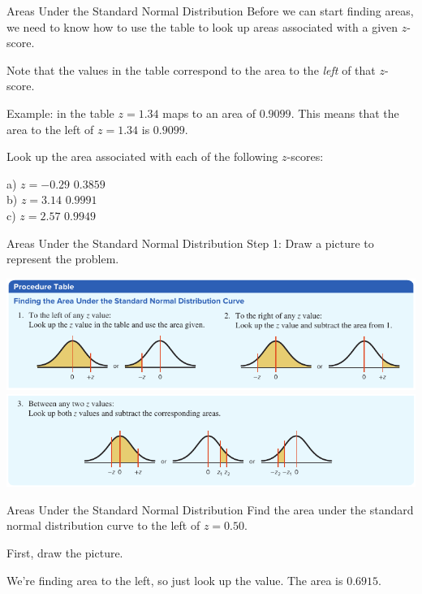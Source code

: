 \documentclass[t, aspectratio=169]{beamer}
\newcommand{\?}{\stackrel{?}{=}}
\begin{document}
	\begin{frame}{Areas Under the Standard Normal Distribution}
		Before we can start finding areas, we need to know how to use the table to look up areas associated with a given $z$-score. \pause
		
		Note that the values in the table correspond to the area to the \textit{left} of that $z$-score. \pause
		
		Example: in the table $z = 1.34$ maps to an area of $0.9099$. This means that the area to the left of $z = 1.34$ is $0.9099$. \pause
		
		Look up the area associated with each of the following $z$-scores:
		
		a) $z = -0.29$ \pause $0.3859$ \pause \\
		b) $z = 3.14$ \pause $0.9991$ \pause \\
		c) $z = 2.57$ \pause $0.9949$
	\end{frame}

	\begin{frame}{Areas Under the Standard Normal Distribution}
		Step 1: Draw a picture to represent the problem. \pause
		
		\includegraphics[width=\textwidth]{proc-table-1.png} \\
		\includegraphics[width=\textwidth]{proc-table-2.png}
	\end{frame}

	\begin{frame}{Areas Under the Standard Normal Distribution}
		Find the area under the standard normal distribution curve to the left of $z = 0.50$. \pause
		
		First, draw the picture. \vspace{1.75in} \pause
		
		We're finding area to the left, so just look up the value. \pause The area is $0.6915$.
	\end{frame}
\end{document}
